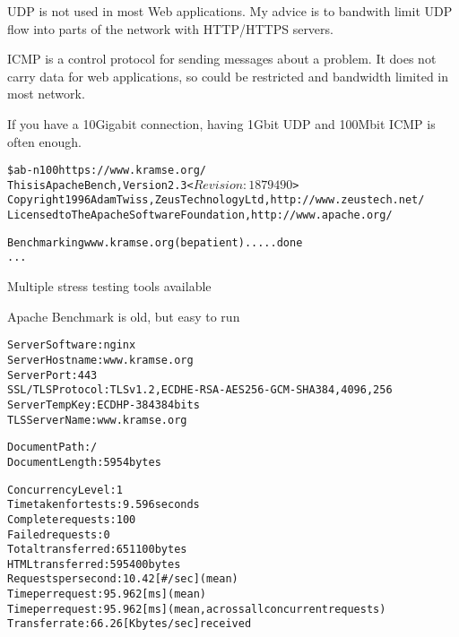 \documentclass[Screen16to9,17pt]{foils}
\begin{document}

UDP is not used in most Web applications. My advice is to bandwith limit UDP flow into parts of the network with HTTP/HTTPS servers.


ICMP is a control protocol for sending messages about a problem. It does not carry data for web applications, so could be restricted and bandwidth limited in most network.

If you have a 10Gigabit connection, having 1Gbit UDP and 100Mbit ICMP is often enough.


\begin{alltt}\footnotesize
\$ ab -n 100 https://www.kramse.org/
This is ApacheBench, Version 2.3 <$Revision: 1879490 $>
Copyright 1996 Adam Twiss, Zeus Technology Ltd, http://www.zeustech.net/
Licensed to The Apache Software Foundation, http://www.apache.org/

Benchmarking www.kramse.org (be patient).....done
...
\end{alltt}

\begin{list1}
\item Multiple stress testing tools available
\item Apache Benchmark is old, but easy to run
\end{list1}


\begin{alltt}
\footnotesize
Server Software:        nginx
Server Hostname:        www.kramse.org
Server Port:            443
SSL/TLS Protocol:       TLSv1.2,ECDHE-RSA-AES256-GCM-SHA384,4096,256
Server Temp Key:        ECDH P-384 384 bits
TLS Server Name:        www.kramse.org

Document Path:          /
Document Length:        5954 bytes

Concurrency Level:      1
Time taken for tests:   9.596 seconds
Complete requests:      100
Failed requests:        0
Total transferred:      651100 bytes
HTML transferred:       595400 bytes
Requests per second:    10.42 [#/sec] (mean)
Time per request:       95.962 [ms] (mean)
Time per request:       95.962 [ms] (mean, across all concurrent requests)
Transfer rate:          66.26 [Kbytes/sec] received
\end{alltt}
\end{document}
